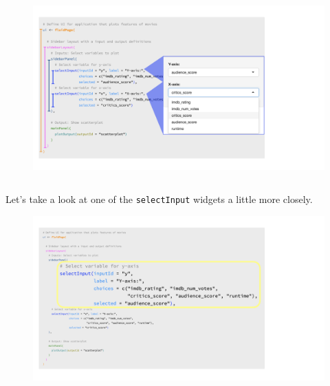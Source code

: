 \documentclass[
  letterpaper,
  DIV=11,
  numbers=noendperiod]{scrreprt}
\begin{document}
\begin{figure}

{\centering \includegraphics[width=1\textwidth,height=\textheight]{./images/input-dropdowns.png}

}

\end{figure}

\hypertarget{section-3}{%
\subsection{}\label{section-3}}

Let's take a look at one of the \texttt{selectInput} widgets a little
more closely.

\begin{figure}

{\centering \includegraphics[width=1\textwidth,height=\textheight]{./images/input-closeup.png}

}

\end{figure}
\end{document}
